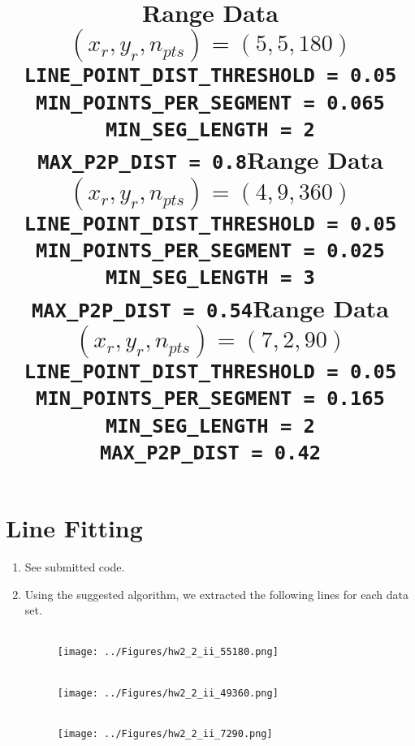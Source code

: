 \documentclass[12pt]{article}
\begin{document}
\section{Line Fitting}
\begin{enumerate}
	\item See submitted code.
	\item Using the suggested algorithm, we extracted the following lines for each data set.
	\begin{figure}[H]
		\centering
		\title{\bf Range Data $(x_r, y_r, n_{pts}) = (5,5,180)$ \\ \vspace{2.5mm}
			\verb|LINE_POINT_DIST_THRESHOLD = 0.05| \\
			\verb|MIN_POINTS_PER_SEGMENT = 0.065| \\
			\verb|MIN_SEG_LENGTH = 2| \\
			\verb|MAX_P2P_DIST = 0.8|}
		\\ \vspace{5mm}
		\texttt{[image: ../Figures/hw2\_2\_ii\_55180.png]}
	\end{figure}
	\begin{figure}[H]
		\centering
		\title{\bf Range Data $(x_r, y_r, n_{pts}) = (4,9,360)$ \\ \vspace{2.5mm}
			\verb|LINE_POINT_DIST_THRESHOLD = 0.05| \\
			\verb|MIN_POINTS_PER_SEGMENT = 0.025| \\
			\verb|MIN_SEG_LENGTH = 3| \\
			\verb|MAX_P2P_DIST = 0.54|}
		\\ \vspace{5mm}
		\texttt{[image: ../Figures/hw2\_2\_ii\_49360.png]}
	\end{figure}
	\begin{figure}[H]
		\centering
		\title{\bf Range Data $(x_r, y_r, n_{pts}) = (7,2,90)$ \\ \vspace{2.5mm}
			\verb|LINE_POINT_DIST_THRESHOLD = 0.05| \\
			\verb|MIN_POINTS_PER_SEGMENT = 0.165| \\
			\verb|MIN_SEG_LENGTH = 2| \\
			\verb|MAX_P2P_DIST = 0.42|}
		\\ \vspace{5mm}
		\texttt{[image: ../Figures/hw2\_2\_ii\_7290.png]}
	\end{figure}
\end{enumerate}
\end{document}
